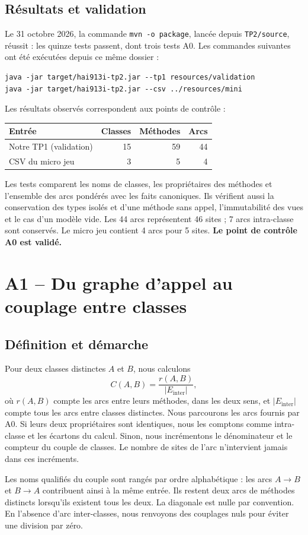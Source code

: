 \documentclass[11pt,a4paper]{article}
\begin{document}
\subsection{Résultats et validation}
Le 31 octobre 2026, la commande \texttt{mvn -o package}, lancée depuis
\texttt{TP2/source}, réussit : les quinze tests passent, dont trois tests A0.
Les commandes suivantes ont été exécutées depuis ce même dossier :
\begin{verbatim}
java -jar target/hai913i-tp2.jar --tp1 resources/validation
java -jar target/hai913i-tp2.jar --csv ../resources/mini
\end{verbatim}
Les résultats observés correspondent aux points de contrôle :
\begin{center}
\begin{tabular}{lrrr}
Entrée & Classes & Méthodes & Arcs \\
\hline
Notre TP1 (validation) & 15 & 59 & 44 \\
CSV du micro jeu & 3 & 5 & 4
\end{tabular}
\end{center}
Les tests comparent les noms de classes, les propriétaires des méthodes et
l'ensemble des arcs pondérés avec les faits canoniques. Ils vérifient aussi
la conservation des types isolés et d'une méthode sans appel, l'immutabilité
des vues et le cas d'un modèle vide. Les 44 arcs représentent 46 sites ;
7 arcs intra-classe sont conservés. Le micro jeu contient 4 arcs pour 5 sites.
\textbf{Le point de contrôle A0 est validé.}

\section{A1 -- Du graphe d'appel au couplage entre classes}
\subsection{Définition et démarche}
Pour deux classes distinctes $A$ et $B$, nous calculons
\[
C(A,B)=\frac{r(A,B)}{|E_{\mathrm{inter}}|},
\]
où $r(A,B)$ compte les arcs entre leurs méthodes, dans les deux sens, et
$|E_{\mathrm{inter}}|$ compte tous les arcs entre classes distinctes.
Nous parcourons les arcs fournis par A0. Si leurs deux propriétaires sont
identiques, nous les comptons comme intra-classe et les écartons du calcul.
Sinon, nous incrémentons le dénominateur et le compteur du couple de classes.
Le nombre de sites de l'arc n'intervient jamais dans ces incréments.

Les noms qualifiés du couple sont rangés par ordre alphabétique : les arcs
$A\rightarrow B$ et $B\rightarrow A$ contribuent ainsi à la même entrée.
Ils restent deux arcs de méthodes distincts lorsqu'ils existent tous les deux.
La diagonale est nulle par convention. En l'absence d'arc inter-classes,
nous renvoyons des couplages nuls pour éviter une division par zéro.
\end{document}

